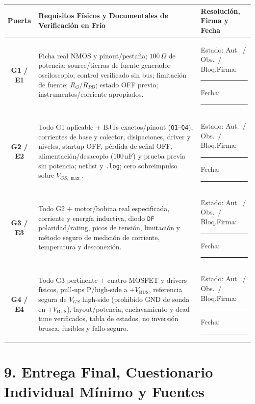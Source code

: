 \documentclass[10pt, a4paper, landscape]{article}
\begin{document}
\par\vspace{0.15cm}\noindent
\renewcommand{\arraystretch}{1.45}
\begin{tabularx}{\linewidth}{|c|X|p{5.2cm}|}
\hline
\rowcolor{ucbgray}
\textbf{Puerta} & \textbf{Requisitos Físicos y Documentales de Verificación en Frío} & \textbf{Resolución, Firma y Fecha} \\ \hline
\textbf{G1 / E1} & Ficha real NMOS y pinout/pestaña; $100\,\Omega$ de potencia; source/tierras de fuente-generador-osciloscopio; control verificado sin bus; limitación de fuente; $R_G/R_{PD}$; estado OFF previo; instrumentos/corriente apropiados. & Estado: Aut.\ / Obs.\ / Bloq.\newline Firma: \rule{3.2cm}{0.4pt}\newline Fecha: \rule{3.2cm}{0.4pt} \\ \hline
\textbf{G2 / E2} & Todo G1 aplicable + BJTs exactos/pinout (\texttt{Q1--Q4}), corrientes de base y colector, disipaciones, driver y niveles, startup OFF, pérdida de señal OFF, alimentación/desacoplo ($100\,\text{nF}$) y prueba previa sin potencia; netlist y \texttt{.log}; cero sobreimpulso sobre $V_{GS,\max}$. & Estado: Aut.\ / Obs.\ / Bloq.\newline Firma: \rule{3.2cm}{0.4pt}\newline Fecha: \rule{3.2cm}{0.4pt} \\ \hline
\textbf{G3 / E3} & Todo G2 + motor/bobina real especificada, corriente y energía inductiva, diodo \texttt{DF} polaridad/rating, picos de tensión, limitación y método seguro de medición de corriente, temperatura y desconexión. & Estado: Aut.\ / Obs.\ / Bloq.\newline Firma: \rule{3.2cm}{0.4pt}\newline Fecha: \rule{3.2cm}{0.4pt} \\ \hline
\textbf{G4 / E4} & Todo G3 pertinente + cuatro MOSFET y drivers físicos, pull-ups P/high-side a $+V_{\text{BUS}}$, referencia segura de $V_{GS}$ high-side (prohibido GND de sonda en $+V_{\text{BUS}}$), layout/potencia, enclavamiento y dead-time verificados, tabla de estados, no inversión brusca, fusibles y fallo seguro. & Estado: Aut.\ / Obs.\ / Bloq.\newline Firma: \rule{3.2cm}{0.4pt}\newline Fecha: \rule{3.2cm}{0.4pt} \\ \hline
\end{tabularx}

\section*{9. Entrega Final, Cuestionario Individual Mínimo y Fuentes}
\end{document}

